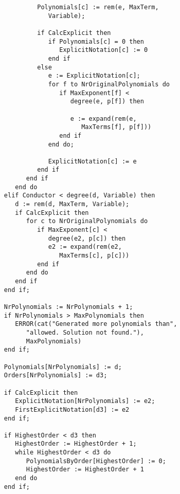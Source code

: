 \begin{verbatim}
                           Polynomials[c] := rem(e, MaxTerm, 
                              Variable);

                           if CalcExplicit then
                              if Polynomials[c] = 0 then
                                 ExplicitNotation[c] := 0
                              end if
                           else
                              e := ExplicitNotation[c];
                              for f to NrOriginalPolynomials do
                                 if MaxExponent[f] < 
                                    degree(e, p[f]) then
                                    
                                    e := expand(rem(e, 
                                       MaxTerms[f], p[f]))
                                 end if
                              end do;

                              ExplicitNotation[c] := e
                           end if
                        end if
                     end do
                  elif Conductor < degree(d, Variable) then
                     d := rem(d, MaxTerm, Variable);
                     if CalcExplicit then
                        for c to NrOriginalPolynomials do
                           if MaxExponent[c] < 
                              degree(e2, p[c]) then
                              e2 := expand(rem(e2, 
                                 MaxTerms[c], p[c]))
                           end if
                        end do
                     end if
                  end if;

                  NrPolynomials := NrPolynomials + 1;
                  if NrPolynomials > MaxPolynomials then
                     ERROR(cat("Generated more polynomials than",
                        "allowed. Solution not found."),
                        MaxPolynomials)
                  end if;

                  Polynomials[NrPolynomials] := d;
                  Orders[NrPolynomials] := d3;

                  if CalcExplicit then
                     ExplicitNotation[NrPolynomials] := e2;
                     FirstExplicitNotation[d3] := e2
                  end if;

                  if HighestOrder < d3 then
                     HighestOrder := HighestOrder + 1;
                     while HighestOrder < d3 do
                        PolynomialsByOrder[HighestOrder] := 0;
                        HighestOrder := HighestOrder + 1
                     end do
                  end if;


\end{verbatim}
